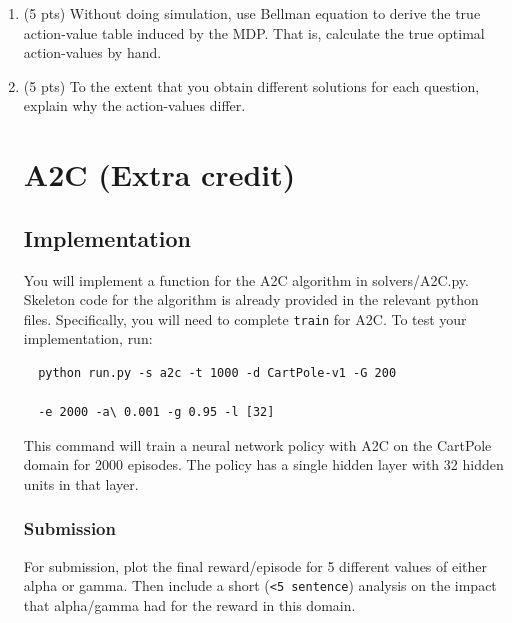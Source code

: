 \documentclass[a4paper]{article}
\theoremstyle{definition}
\begin{document}
\begin{enumerate}
	\item (5 pts) Without doing simulation, use Bellman equation to derive the true action-value table induced by the MDP. That is, calculate the true optimal action-values by hand.

	\item (5 pts) To the extent that you obtain different solutions for each question, explain why the action-values  differ.

	      \section{A2C (Extra credit)}
	      \subsection{Implementation}

	      You will implement a function for the A2C algorithm in solvers/A2C.py.
	      Skeleton code for the algorithm is already provided in the relevant python files.
	      Specifically, you will need to complete \verb|train| for A2C.
	      To test your implementation, run:
	      \begin{verbatim}
  python run.py -s a2c -t 1000 -d CartPole-v1 -G 200 
  
  -e 2000 -a\ 0.001 -g 0.95 -l [32]
\end{verbatim}
	      This command will train a neural network policy with A2C on the CartPole domain for 2000 episodes.
	      The policy has a single hidden layer with 32 hidden units in that layer.
	      \subsubsection*{Submission}

	      For submission, plot the final reward/episode for 5 different values of either alpha or gamma. Then include a short (\verb|<5 sentence|) analysis on the impact that alpha/gamma had for the reward in this domain.



\end{enumerate}
\end{document}
